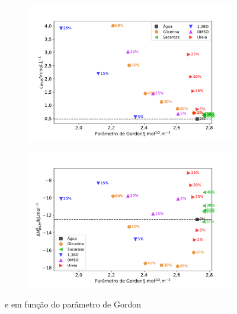 		\begin{figure}[h]
			\begin{subfigure}[t]{0.5\textwidth}
				\centering
				\includegraphics[width=\linewidth]{imagens/itc/Cwlm_por_G}
				\caption{\cwlm}
				\label{fig:cwlm_por_g}
			\end{subfigure} %
			\begin{subfigure}[t]{0.5\textwidth}
				\centering
				\includegraphics[width=\textwidth]{imagens/itc/DHwlm_por_G}
				\caption{\DHwlm}
				\label{fig:dhwlm_por_g}
			\end{subfigure}
			\caption{\cwlm{} e \DHwlm{} em função do parâmetro de Gordon}
			\label{fig:cwlm_dhwlm_por_g}
		\end{figure}
		
